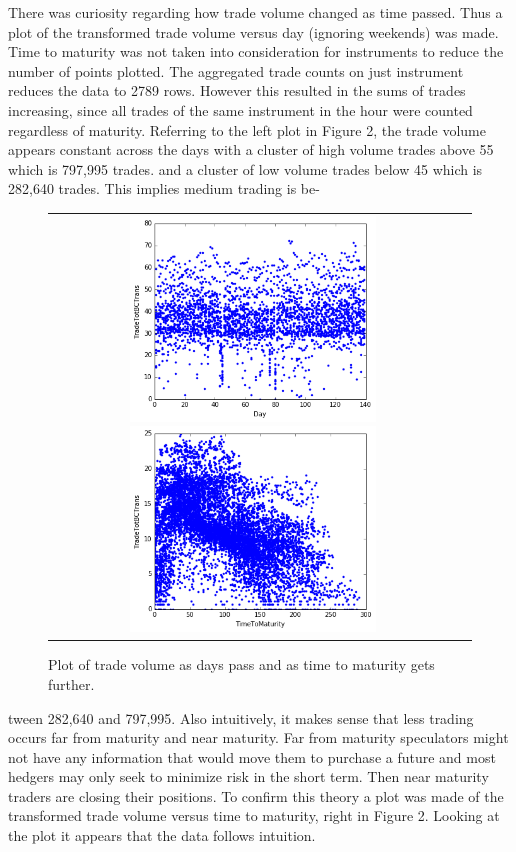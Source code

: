 \documentclass[12pt]{article}
\begin{document}
There was curiosity regarding how trade volume changed as time passed. Thus a plot of the transformed trade volume versus day (ignoring weekends) was made. Time to maturity was not taken into consideration for  instruments to reduce the number of points plotted. The aggregated trade counts on just instrument reduces the data to 2789 rows. However this resulted in the sums of trades increasing, since all trades of the same instrument in the hour were counted regardless of maturity. Referring to the left plot in Figure 2, the trade volume appears constant across the days with a cluster of high volume trades above 55 which is 797,995 trades. and a cluster of low volume trades below 45 which is 282,640 trades. This implies medium trading is be-

\begin{figure}[H]
	\begin{center}
		\begin{tabular}{cc}
			\includegraphics[width=6.5cm]{bc_sample_day.png}
			\includegraphics[width=6.5cm]{time_to_mat.png}
		\end{tabular}
		\caption{Plot of trade volume as days pass and as time to maturity gets further.}
		\label{fig:1}
	\end{center}
\end{figure}

\noindent tween 282,640 and 797,995. Also intuitively, it makes sense that less trading occurs far from maturity and near maturity. Far from maturity speculators might not have any information that would move them to purchase a future and most hedgers may only seek to minimize risk in the short term. Then near maturity traders are closing their positions. To confirm this theory a plot was made of the transformed trade volume versus time to maturity, right in Figure 2. Looking at the plot it appears that the data follows intuition. 
 
\end{document}

